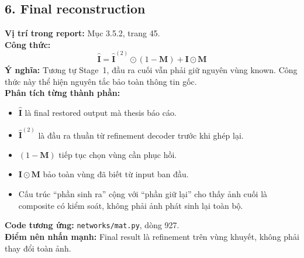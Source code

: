 \documentclass[12pt,a4paper]{article}
\begin{document}
\subsection*{6. Final reconstruction}
\textbf{Vị trí trong report:} Mục 3.5.2, trang 45.\\
\textbf{Công thức:}
\[
\hat{\mathbf{I}} = \hat{\mathbf{I}}^{(2)} \odot (1-\mathbf{M}) + \mathbf{I} \odot \mathbf{M}
\]
\textbf{Ý nghĩa:} Tương tự Stage~1, đầu ra cuối vẫn phải giữ nguyên vùng known. Công thức này thể hiện nguyên tắc bảo toàn thông tin gốc.\\
\textbf{Phân tích từng thành phần:}
\begin{itemize}[leftmargin=1.5em]
\item $\hat{\mathbf{I}}$ là final restored output mà thesis báo cáo.
\item $\hat{\mathbf{I}}^{(2)}$ là đầu ra thuần từ refinement decoder trước khi ghép lại.
\item $(1-\mathbf{M})$ tiếp tục chọn vùng cần phục hồi.
\item $\mathbf{I}\odot\mathbf{M}$ bảo toàn vùng đã biết từ input ban đầu.
\item Cấu trúc ``phần sinh ra'' cộng với ``phần giữ lại'' cho thấy ảnh cuối là composite có kiểm soát, không phải ảnh phát sinh lại toàn bộ.
\end{itemize}
\textbf{Code tương ứng:} \texttt{networks/mat.py}, dòng 927.\\
\textbf{Điểm nên nhấn mạnh:} Final result là refinement trên vùng khuyết, không phải thay đổi toàn ảnh.
\end{document}

